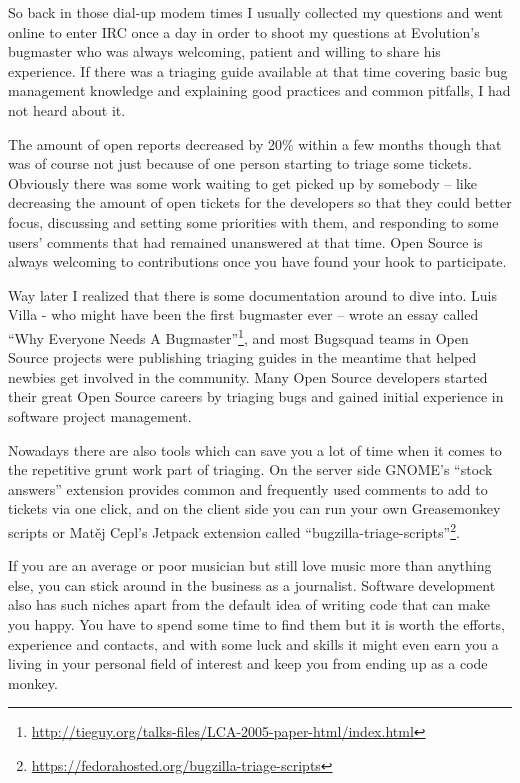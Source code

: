 So back in those dial-up modem times I usually collected my questions and went
online to enter IRC once a day in order to shoot my questions at Evolution's
bugmaster who was always welcoming, patient and willing to share his experience.
If there was a triaging guide available at that time covering basic bug
management knowledge and explaining good practices and common pitfalls, I had
not heard about it.

The amount of open reports decreased by 20\% within a few months though that was
of course not just because of one person starting to triage some tickets.
Obviously there was some work waiting to get picked up by somebody -- like
decreasing the amount of open tickets for the developers so that they could
better focus, discussing and setting some priorities with them, and responding
to some users' comments that had remained unanswered at that time. Open Source
is always welcoming to contributions once you have found your hook to
participate.

Way later I realized that there is some documentation around to dive into. Luis
Villa - who might have been the first bugmaster ever -- wrote an essay called
``Why Everyone Needs A Bugmaster''\footnote{\url{
http://tieguy.org/talks-files/LCA-2005-paper-html/index.html}}, and most
Bugsquad teams in Open Source projects were publishing triaging guides in the
meantime that helped newbies get involved in the community. Many Open Source
developers started their great Open Source careers by triaging bugs and gained
initial experience in software project management.

Nowadays there are also tools which can save you a lot of time when it comes to
the repetitive grunt work part of triaging. On the server side GNOME's ``stock
answers'' extension provides common and frequently used comments to add to
tickets via one click, and on the client side you can run your own Greasemonkey
scripts or Matěj Cepl's Jetpack extension called
``bugzilla-triage-scripts''\footnote{\url{
https://fedorahosted.org/bugzilla-triage-scripts}}.

If you are an average or poor musician but still love music more than anything
else, you can stick around in the business as a journalist. Software development also has such niches apart from the default idea of writing code that can make you happy. You have to spend some time to find them but it is worth the efforts, experience and contacts, and with some luck and skills it might even earn you a living in your personal field of interest and keep you from ending up as a code monkey.
